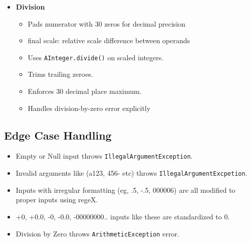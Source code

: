 \documentclass[12pt]{article}
\begin{document}
\begin{spacing}{1.2}
\begin{itemize}[leftmargin=*]
    \item \textbf{Division}
    \begin{itemize}
        \item Pads numerator with 30 zeros for decimal precision
        \item final scale: relative scale difference between operands
        \item Uses \texttt{AInteger.divide()} on scaled integers.
        \item Trims trailing zeroes.
        \item Enforces 30 decimal place maximum.
        \item Handles division-by-zero error explicitly
    \end{itemize}

    
\end{itemize}

\subsection{Edge Case Handling}
\begin{itemize}
    \item Empty or Null input throws \texttt{IllegalArgumentException}.
    \item Invalid arguments like (a123, 456- etc) throws \texttt{IllegalArgumentExcpetion}.
    \item Inputs with irregular formatting (eg, .5, -.5, 000006) are all modified to proper inputs using regeX.
    \item +0, +0.0, -0, -0.0, -00000000.. inputs like these are standardized to 0.
    \item Division by Zero throws \texttt{ArithmeticException} error.
\end{itemize}


\end{spacing}
\end{document}
